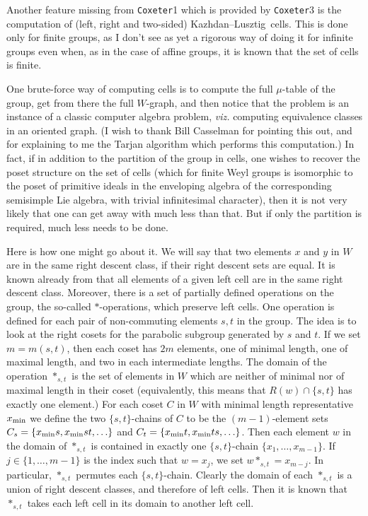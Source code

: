 \documentclass[11pt]{article}
\newcommand{\coxeter}{{\tt Coxeter}}
\newcommand{\kl}{Kazh\-dan--Lusz\-tig}
\renewcommand{\min}{_{\rm min}}
\begin{document}
Another feature missing from \coxeter1 which is provided by \coxeter3 is the
computation of (left, right and two-sided) \kl\ cells. This is done only for
finite groups, as I don't see as yet a rigorous way of doing it for infinite
groups even when, as in the case of affine groups, it is known that the set
of cells is finite.

One brute-force way of computing cells is to compute the full $\mu$-table of
the group, get from there the full $W$-graph, and then notice that the problem
is an instance of a classic computer algebra problem, {\em viz.} computing
equivalence classes in an oriented graph. (I wish to thank Bill Casselman for
pointing this out, and for explaining to me the Tarjan algorithm which
performs this computation.) In fact, if in addition to the partition of the
group in cells, one wishes to recover the poset structure on the set of cells
(which for finite Weyl groups is isomorphic to the poset of primitive ideals
in the enveloping algebra of the corresponding semisimple Lie algebra, with
trivial infinitesimal character), then it is not very likely that one can get
away with much less than that. But if only the partition is required, much
less needs to be done.

Here is how one might go about it. We will say that two elements $x$ and $y$
in $W$ are in the same right descent class, if their right descent sets are
equal. It is known already from \cite{kl:1979} that all elements of a given
left cell are in the same right descent class.
Moreover, there is a set of partially defined operations on the group, the
so-called $*$-operations, which preserve left cells. One operation is defined
for each pair of non-commuting elements $s,t$ in the group. The idea is to
look at the right cosets for the parabolic subgroup generated by $s$ and $t$.
If we set $m=m(s,t)$, then each coset has $2m$ elements, one of minimal
length, one of maximal length, and two in each intermediate lengths. The
domain of the operation $*_{s,t}$ is the set of elements in $W$ which are
neither of minimal nor of maximal length in their coset (equivalently, this
means that $R(w)\cap\{s,t\}$ has exactly one element.) For each coset $C$
in $W$ with minimal length representative $x\min$ we define the two
$\{s,t\}$-chains of $C$ to be the $(m-1)$-element sets
$C_s=\{x\min s,x\min st,\ldots\}$ and $C_t=\{x\min t,x\min ts,\ldots\}$.
Then each element $w$ in the domain of $*_{s,t}$ is contained in exactly one
$\{s,t\}$-chain $\{x_1,\ldots,x_{m-1}\}$. If $j\in\{1,\ldots,m-1\}$ is the
index such that $w=x_j$, we set $w*_{s,t}=x_{m-j}$. In particular, $*_{s,t}$
permutes each $\{s,t\}$-chain. Clearly the domain of each $*_{s,t}$ is a
union of right descent classes, and therefore of left cells. Then it is known
\cite{lusztig:1985} that $*_{s,t}$ takes each left cell in its domain to
another left cell.
\end{document}
